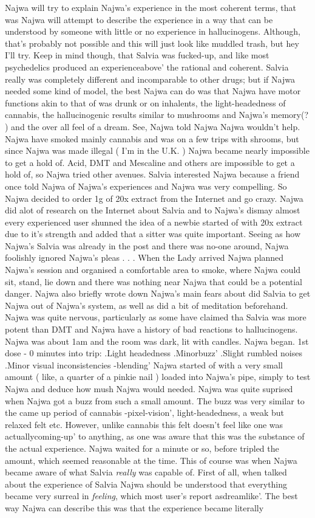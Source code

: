 \documentclass[12pt]{book}
\begin{document}
Najwa will try to explain Najwa's experience in the most coherent terms, that was Najwa will attempt to describe the experience in a way that can be understood by someone with little or no experience in hallucinogens. Although, that's probably not possible and this will just look like muddled trash, but hey I'll try. Keep in mind though, that Salvia was fucked-up, and like most psychedelics produced an experienceabove' the rational and coherent. Salvia really was completely different and incomparable to other drugs; but if Najwa needed some kind of model, the best Najwa can do was that Najwa have motor functions akin to that of was drunk or on inhalents, the light-headedness of cannabis, the hallucinogenic results similar to mushrooms and Najwa's memory(? ) and the over all feel of a dream. See, Najwa told Najwa Najwa wouldn't help. Najwa have smoked mainly cannabis and was on a few trips with shrooms, but since Najwa was made illegal ( I'm in the U.K. ) Najwa became nearly impossible to get a hold of. Acid, DMT and Mescaline and others are impossible to get a hold of, so Najwa tried other avenues. Salvia interested Najwa because a friend once told Najwa of Najwa's experiences and Najwa was very compelling. So Najwa decided to order 1g of 20x extract from the Internet and go crazy. Najwa did alot of research on the Internet about Salvia and to Najwa's dismay almost every experienced user shunned the idea of a newbie started of with 20x extract due to it's strength and added that a sitter was quite important. Seeing as how Najwa's Salvia was already in the post and there was no-one around, Najwa foolishly ignored Najwa's pleas . . .  When the Lady arrived Najwa planned Najwa's session and organised a comfortable area to smoke, where Najwa could sit, stand, lie down and there was nothing near Najwa that could be a potential danger. Najwa also briefly wrote down Najwa's main fears about did Salvia to get Najwa out of Najwa's system, as well as did a bit of meditation beforehand. Najwa was quite nervous, particularly as some have claimed tha Salvia was more potent than DMT and Najwa have a history of bad reactions to hallucinogens. Najwa was about 1am and the room was dark, lit with candles. Najwa began. 1st dose - 0 minutes into trip: .Light headedness .Minorbuzz' .Slight rumbled noises .Minor visual inconsistencies -blending' Najwa started of with a very small amount ( like, a quarter of a pinkie nail ) loaded into Najwa's pipe, simply to test Najwa and deduce how mush Najwa would needed. Najwa was quite suprised when Najwa got a buzz from such a small amount. The buzz was very similar to the came up period of cannabis -pixel-vision', light-headedness, a weak but relaxed felt etc. However, unlike cannabis this felt doesn't feel like one was actuallycoming-up' to anything, as one was aware that this was the substance of the actual experience. Najwa waited for a minute or so, before tripled the amount, which seemed reasonable at the time. This of course was when Najwa became aware of what Salvia \emph{really} was capable of. First of all, when talked about the experience of Salvia Najwa should be understood that everything became very surreal in \emph{feeling}, which most user's report asdreamlike'. The best way Najwa can describe this was that the experience became literally 
\end{document}
